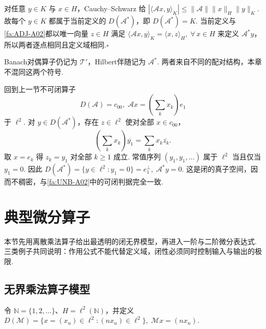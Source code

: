 \begin{FAProof}
对任意 \(\displaystyle y\in K\) 与 \(\displaystyle x\in H\)，Cauchy--Schwarz 给
\(\displaystyle |\langle\mathcal Ax,y\rangle_K| \leqslant \|\mathcal A\|\|x\|_H\|y\|_K.\)
故每个 \(\displaystyle y\in K\) 都属于当前定义的 \(\displaystyle D(\mathcal A^*)\)，即 \(\displaystyle D(\mathcal A^*)=K\). 当前定义与\autoref{fa:ADJ-A02}都以唯一向量 \(\displaystyle z\in H\) 满足
\(\displaystyle \langle\mathcal Ax,y\rangle_K=\langle x,z\rangle_H ,\;\forall\,x\in H\)
来定义 \(\displaystyle\mathcal A^*y\)，所以两者逐点相同且定义域相同.\hfill\(\square\)
\end{FAProof}

Banach对偶算子仍记为 \(\displaystyle\mathcal T'\)，Hilbert伴随记为 \(\displaystyle\mathcal A^*\). 两者来自不同的配对结构，本章不混同这两个符号.

\begin{FAExample}[不可闭算子的伴随定义域审计]
回到上一节不可闭算子
\[
D(\mathcal A)=c_{00},
\;
\mathcal Ax=\left(\sum_kx_k\right)e_1
\]
于 \(\displaystyle\ell^2\). 对 \(\displaystyle y\in D(\mathcal A^*)\)，存在 \(\displaystyle z\in\ell^2\) 使对全部 \(\displaystyle x\in c_{00}\)，
\[
\left(\sum_kx_k\right)\overline{y_1}
=
\sum_kx_k\overline{z_k}.
\]
取 \(\displaystyle x=e_k\) 得 \(\displaystyle z_k=y_1\) 对全部 \(\displaystyle k\geqslant1\) 成立. 常值序列 \(\displaystyle(y_1,y_1,\dots)\) 属于 \(\displaystyle\ell^2\) 当且仅当 \(\displaystyle y_1=0\). 因此
\(\displaystyle D(\mathcal A^*) = \{y\in\ell^2:y_1=0\} = e_1^\perp, \; \mathcal A^*y=0.\)
这是闭的真子空间，因而不稠密，与\autoref{fa:UNB-A02}中的可闭判据完全一致.
\end{FAExample}

\section{典型微分算子}\label{sec:ii05-differential-operators}

本节先用离散乘法算子给出最透明的闭无界模型，再进入一阶与二阶微分表达式. 三类例子共同说明：作用公式不能代替定义域，闭性必须同时控制输入与输出的极限.

\subsection{无界乘法算子模型}

令 \(\displaystyle\mathbb N=\{1,2,\dots\}\)、\(\displaystyle H=\ell^2(\mathbb N)\)，并定义
\(\displaystyle D(\mathcal M) = \{x=(x_n)\in\ell^2:(nx_n)\in\ell^2\}, \; \mathcal Mx=(nx_n).\)

